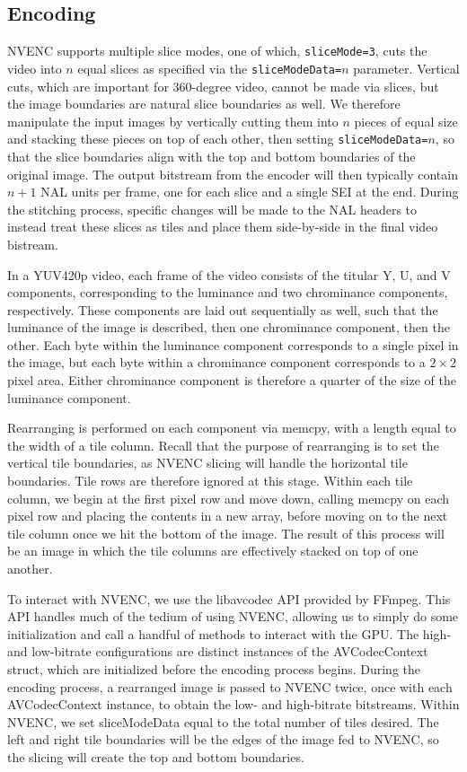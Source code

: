 \subsection{Encoding}
NVENC supports multiple slice modes, one of which, \texttt{sliceMode=3}, cuts the video into $n$ equal slices as specified via the \texttt{sliceModeData=}$n$ parameter. Vertical cuts, which are important for 360-degree video, cannot be made via slices, but the image boundaries are natural slice boundaries as well. We therefore manipulate the input images by vertically cutting them into $n$ pieces of equal size and stacking these pieces on top of each other, then setting \texttt{sliceModeData=}$n$, so that the slice boundaries align with the top and bottom boundaries of the original image. The output bitstream from the encoder will then typically contain $n+1$ NAL units per frame, one for each slice and a single SEI at the end. During the stitching process, specific changes will be made to the NAL headers to instead treat these slices as tiles and place them side-by-side in the final video bistream.

In a YUV420p video, each frame of the video consists of the titular Y, U, and V components, corresponding to the luminance and two chrominance components, respectively. These components are laid out sequentially as well, such that the luminance of the image is described, then one chrominance component, then the other. Each byte within the luminance component corresponds to a single pixel in the image, but each byte within a chrominance component corresponds to a $2\times2$ pixel area. Either chrominance component is therefore a quarter of the size of the luminance component.

Rearranging is performed on each component via memcpy, with a length equal to the width of a tile column. Recall that the purpose of rearranging is to set the vertical tile boundaries, as NVENC slicing will handle the horizontal tile boundaries. Tile rows are therefore ignored at this stage. Within each tile column, we begin at the first pixel row and move down, calling memcpy on each pixel row and placing the contents in a new array, before moving on to the next tile column once we hit the bottom of the image. The result of this process will be an image in which the tile columns are effectively stacked on top of one another.

To interact with NVENC, we use the libavcodec API provided by FFmpeg. This API handles much of the tedium of using NVENC, allowing us to simply do some initialization and call a handful of methods to interact with the GPU. The high- and low-bitrate configurations are distinct instances of the AVCodecContext struct, which are initialized before the encoding process begins. During the encoding process, a rearranged image is passed to NVENC twice, once with each AVCodecContext instance, to obtain the low- and high-bitrate bitstreams. Within NVENC, we set sliceModeData equal to the total number of tiles desired. The left and right tile boundaries will be the edges of the image fed to NVENC, so the slicing will create the top and bottom boundaries.

